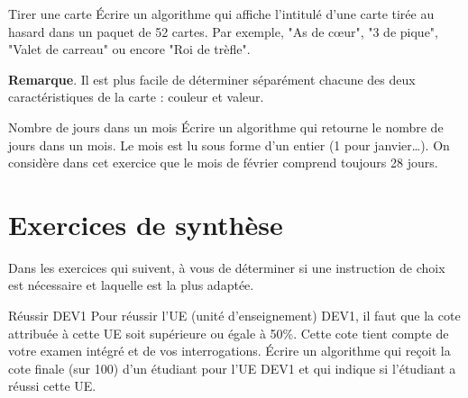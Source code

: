 	\begin{Exercice}{Tirer une carte}
		Écrire un algorithme qui affiche l’intitulé d’une carte
		tirée au hasard dans un paquet de 52 cartes.
		Par exemple, "As de cœur", "3 de pique", "Valet de carreau"
		ou encore "Roi de trèfle".
		
		\textbf{Remarque}. Il est plus facile de déterminer séparément
		chacune des deux caractéristiques de la carte : couleur et valeur.
	\end{Exercice}
	
	\begin{Exercice}{Nombre de jours dans un mois}
		Écrire un algorithme qui retourne le nombre de jours dans un mois. 
		Le mois est lu sous forme d’un entier (1 pour janvier\dots).
		On considère dans cet exercice que le mois de février
		comprend toujours 28 jours.
	\end{Exercice}
		
\section{Exercices de synthèse}

	Dans les exercices qui suivent,
	à vous de déterminer si une instruction de choix est nécessaire
	et laquelle est la plus adaptée.

	\begin{Exercice}{Réussir DEV1}
		Pour réussir l’UE (unité d’enseignement) DEV1,
		il faut que la cote attribuée à cette UE 
		soit supérieure ou égale à 50\%.
		Cette cote tient compte de votre examen intégré
		et de vos interrogations.
		Écrire un algorithme 
		qui reçoit la cote finale (sur 100)
		d’un étudiant pour l’UE DEV1
		et qui indique si l’étudiant a réussi cette UE.
	\end{Exercice}	
		
\begin{comment}
	\begin{Exercice}{Réussir GEN1}
		\marginicon{java}
		\label{algo:réussirGEN1}
		l'UE (Unité d'enseignement) GEN1 est composée de trois AA (activité d’apprentissage) :
		Mathématique, Communication anglophone et Comptabilité%
		\footnote{%
			Sans parler de Méthodologie qui ne donne pas lieu à une évaluation.
		}.
		Pour réussir cette unité d’enseignement,
		il faut que la cote attribuée à chaque AA soit supérieure ou égale à 50\%.
		Si c'est le cas, la cote attribuée à l'UE est une moyenne \textbf{pondérée}
		des trois cotes d'AA 
		(avec la pondération 6 pour Mathématique et 2 pour les autres AA).
		
		Écrire un algorithme qui reçoit les 3 cotes (sur 20) d’AA d’un étudiant
		pour l’UE GEN1 et qui \textbf{affiche} un message
		indiquant si l’étudiant a réussi ou pas cette UE.
		S’il a réussi, l’algorithme affiche également la cote d'UE (sur 20).
	\end{Exercice}		
\end{comment}

